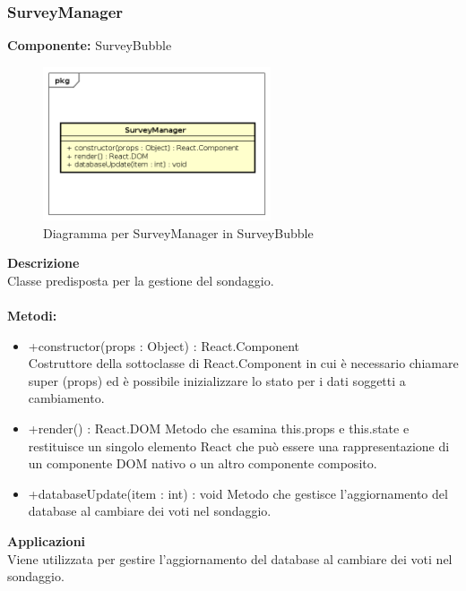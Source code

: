 \subsubsection{SurveyManager}
\textbf{Componente:}  SurveyBubble\\
   \FloatBarrier
   \begin{figure}[ht]
   \centering
   \includegraphics[width=0.6\textwidth]{img/single-SurveyManager}
   \caption{{Diagramma per SurveyManager in SurveyBubble}}
\end{figure}
\FloatBarrier
\textbf{Descrizione}\\
Classe predisposta per la gestione del sondaggio.
\\
\\
\textbf{Metodi:} 
\begin{itemize}
\item +constructor(props : Object) : React.Component 
\\
Costruttore della sottoclasse di React.Component in cui è necessario chiamare super (props) ed è possibile inizializzare lo stato per i dati soggetti a cambiamento.

\item +render() : React.DOM
Metodo che esamina this.props e this.state e restituisce un singolo elemento React che può essere una rappresentazione di un componente DOM nativo o un altro componente composito.

\item +databaseUpdate(item : int) : void
Metodo che gestisce l'aggiornamento del database al cambiare dei voti nel sondaggio.
\end{itemize} 


\textbf{Applicazioni}\\
Viene utilizzata per gestire l'aggiornamento del database al cambiare dei voti nel sondaggio. 


\clearpage

